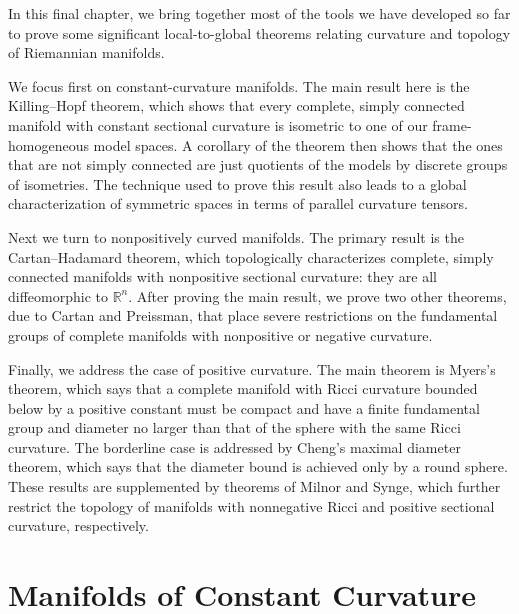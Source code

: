 
In this final chapter, we bring together most of the tools we have developed so far to prove some significant local-to-global theorems relating curvature and topology of Riemannian manifolds.

We focus first on constant-curvature manifolds. The main result here is the Killing--Hopf theorem, which shows that every complete, simply connected manifold with constant sectional curvature is isometric to one of our frame-homogeneous model spaces. A corollary of the theorem then shows that the ones that are not simply connected are just quotients of the models by discrete groups of isometries. The technique used to prove this result also leads to a global characterization of symmetric spaces in terms of parallel curvature tensors.

Next we turn to nonpositively curved manifolds. The primary result is the Cartan--Hadamard theorem, which topologically characterizes complete, simply connected manifolds with nonpositive sectional curvature: they are all diffeomorphic to $\mathbb{R}^n$. After proving the main result, we prove two other theorems, due to Cartan and Preissman, that place severe restrictions on the fundamental groups of complete manifolds with nonpositive or negative curvature.

Finally, we address the case of positive curvature. The main theorem is Myers's theorem, which says that a complete manifold with Ricci curvature bounded below by a positive constant must be compact and have a finite fundamental group and diameter no larger than that of the sphere with the same Ricci curvature. The borderline case is addressed by Cheng's maximal diameter theorem, which says that the diameter bound is achieved only by a round sphere. These results are supplemented by theorems of Milnor and Synge, which further restrict the topology of manifolds with nonnegative Ricci and positive sectional curvature, respectively.

\section{Manifolds of Constant Curvature}

